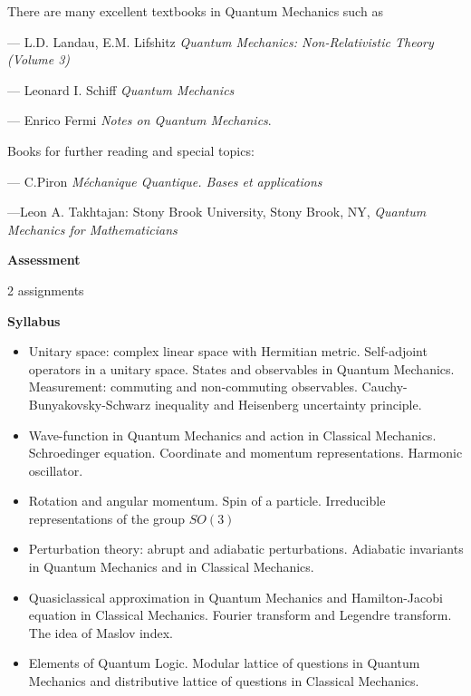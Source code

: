 \documentclass[12pt]{article}
\begin{document}
There are many excellent textbooks in Quantum Mechanics such as
  

 --- L.D. Landau, E.M. Lifshitz   {\it Quantum Mechanics: 
     Non-Relativistic Theory (Volume 3)}


\smallskip

  --- Leonard I. Schiff {\it Quantum Mechanics}

\smallskip

   ---  Enrico Fermi {\it Notes on Quantum Mechanics}.



\medskip

Books for further reading and  special topics: 

   --- C.Piron {\it M\'echanique Quantique. 
        Bases et applications}

\medskip

    ---Leon A. Takhtajan: 
  Stony Brook University, Stony Brook, NY, 
{\it Quantum Mechanics for Mathematicians}

\bigskip



{\bf Assessment}

2 assignments

\medskip


{\bf Syllabus}

\begin{itemize}

 \item 
Unitary space: complex linear space with Hermitian metric.
Self-adjoint operators in a unitary space. 
States and observables in
Quantum Mechanics. Measurement: 
commuting and non-commuting observables.
Cauchy-Bunyakovsky-Schwarz inequality and Heisenberg uncertainty principle.
 
\item  Wave-function in Quantum Mechanics and action in Classical
Mechanics. Schroedinger equation. Coordinate and momentum
representations. Harmonic oscillator.
 	

\item Rotation and angular momentum. Spin of a particle.
    Irreducible representations of the group $SO(3)$


\item 
Perturbation theory: abrupt and adiabatic perturbations.
Adiabatic invariants in Quantum Mechanics and in Classical Mechanics.
 

\item Quasiclassical approximation in Quantum Mechanics and
Hamilton-Jacobi equation in Classical Mechanics. 
Fourier transform and
Legendre transform. The idea of Maslov index.
 	

\item Elements of Quantum Logic. Modular lattice of questions
in Quantum Mechanics and distributive lattice of
questions in  Classical Mechanics.

\end{itemize}
\end{document}
